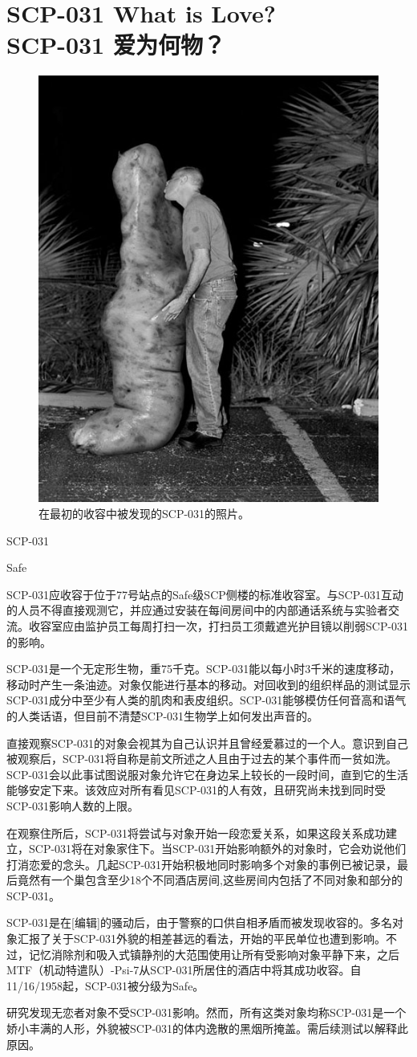 \chapter[SCP-031 爱为何物？]{
    SCP-031 What is Love?\\
    SCP-031 爱为何物？
}

\label{chap:SCP-031}

\begin{figure}[H]
    \centering
    \includegraphics[width=0.5\linewidth]{images/SCP-031.jpg}
    \caption*{在最初的收容中被发现的SCP-031的照片。}
\end{figure}

SCP-031

Safe

SCP-031应收容于位于77号站点的Safe级SCP侧楼的标准收容室。与SCP-031互动的人员不得直接观测它，并应通过安装在每间房间中的内部通话系统与实验者交流。收容室应由监护员工每周打扫一次，打扫员工须戴遮光护目镜以削弱SCP-031的影响。

SCP-031是一个无定形生物，重75千克。SCP-031能以每小时3千米的速度移动，移动时产生一条油迹。对象仅能进行基本的移动。对回收到的组织样品的测试显示SCP-031成分中至少有人类的肌肉和表皮组织。SCP-031能够模仿任何音高和语气的人类话语，但目前不清楚SCP-031生物学上如何发出声音的。

直接观察SCP-031的对象会视其为自己认识并且曾经爱慕过的一个人。意识到自己被观察后，SCP-031将自称是前文所述之人且由于过去的某个事件而一贫如洗。SCP-031会以此事试图说服对象允许它在身边呆上较长的一段时间，直到它的生活能够安定下来。该效应对所有看见SCP-031的人有效，且研究尚未找到同时受SCP-031影响人数的上限。

在观察住所后，SCP-031将尝试与对象开始一段恋爱关系，如果这段关系成功建立，SCP-031将在对象家住下。当SCP-031开始影响额外的对象时，它会劝说他们打消恋爱的念头。几起SCP-031开始积极地同时影响多个对象的事例已被记录，最后竟然有一个巢包含至少18个不同酒店房间,这些房间内包括了不同对象和部分的SCP-031。

SCP-031是在{[}编辑]的骚动后，由于警察的口供自相矛盾而被发现收容的。多名对象汇报了关于SCP-031外貌的相差甚远的看法，开始的平民单位也遭到影响。不过，记忆消除剂和吸入式镇静剂的大范围使用让所有受影响对象平静下来，之后MTF（机动特遣队）-Psi-7从SCP-031所居住的酒店中将其成功收容。自11\slash 16\slash 1958起，SCP-031被分级为Safe。

研究发现无恋者对象不受SCP-031影响。然而，所有这类对象均称SCP-031是一个娇小丰满的人形，外貌被SCP-031的体内逸散的黑烟所掩盖。需后续测试以解释此原因。
